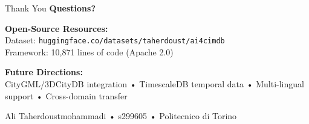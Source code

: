 \documentclass{beamer}
\begin{document}
\begin{frame}{Thank You}
\centering
\vspace{1cm}
{\Large \textbf{Questions?}}

\vspace{1cm}
\textbf{Open-Source Resources:}\\
\vspace{0.3cm}
Dataset: \texttt{huggingface.co/datasets/taherdoust/ai4cimdb}\\
\vspace{0.2cm}
Framework: 10,871 lines of code (Apache 2.0)

\vspace{1cm}
\textbf{Future Directions:}\\
{\small CityGML/3DCityDB integration • TimescaleDB temporal data • Multi-lingual support • Cross-domain transfer}

\vspace{1cm}
{\small Ali Taherdoustmohammadi • s299605 • Politecnico di Torino}
\end{frame}

\backmatter
\end{document}
